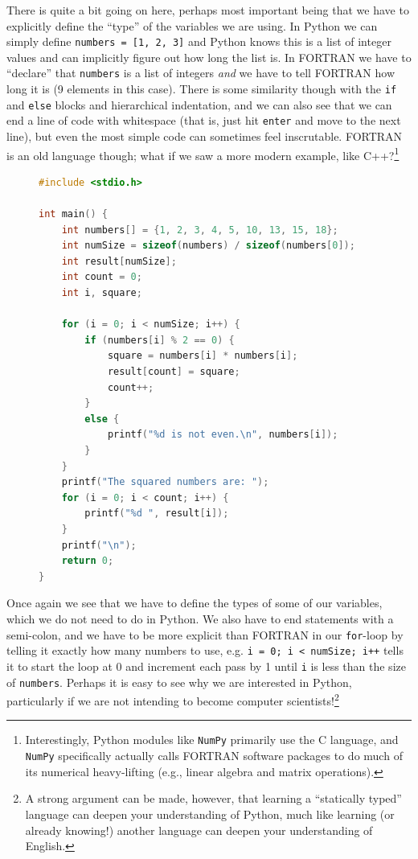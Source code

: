 \documentclass{tufte-book}
\begin{document}
There is quite a bit going on here, perhaps most important being that we have to explicitly define the ``type'' of the variables we are using. In Python we can simply define \verb|numbers = [1, 2, 3]| and Python knows this is a list of integer values and can implicitly figure out how long the list is. In FORTRAN we have to ``declare'' that \verb|numbers| is a list of integers \textit{and} we have to tell FORTRAN how long it is (9 elements in this case). There is some similarity though with the \verb|if| and \verb|else| blocks and hierarchical indentation, and we can also see that we can end a line of code with whitespace (that is, just hit \verb|enter| and move to the next line), but even the most simple code can sometimes feel inscrutable. FORTRAN is an old language though; what if we saw a more modern example, like C++?\footnote{Interestingly, Python modules like \texttt{NumPy} primarily use the C language, and \texttt{NumPy} specifically actually calls FORTRAN software packages to do much of its numerical heavy-lifting (e.g., linear algebra and matrix operations).}
\newpage
\begin{figure}[h]
\begin{lstlisting}[backgroundcolor=\color{lightgray}, language=C++, showstringspaces=false]
#include <stdio.h>

int main() {
    int numbers[] = {1, 2, 3, 4, 5, 10, 13, 15, 18};
	int numSize = sizeof(numbers) / sizeof(numbers[0]);
    int result[numSize];
    int count = 0;
    int i, square;

    for (i = 0; i < numSize; i++) {
        if (numbers[i] % 2 == 0) {
            square = numbers[i] * numbers[i];
            result[count] = square;
            count++;
        }
        else {
            printf("%d is not even.\n", numbers[i]);
        }
    }
    printf("The squared numbers are: ");
    for (i = 0; i < count; i++) {
        printf("%d ", result[i]);
    }
    printf("\n");
    return 0;
}
\end{lstlisting}
\end{figure}

Once again we see that we have to define the types of some of our variables, which we do not need to do in Python. We also have to end statements with a semi-colon, and we have to be more explicit than FORTRAN in our \verb|for|-loop by telling it exactly how many numbers to use, e.g. \verb|i = 0; i < numSize; i++| tells it to start the loop at 0 and increment each pass by 1 until \verb|i| is less than the size of \verb|numbers|. Perhaps it is easy to see why we are interested in Python, particularly if we are not intending to become computer scientists!\footnote{A strong argument can be made, however, that learning a ``statically typed'' language can deepen your understanding of Python, much like learning (or already knowing!) another language can deepen your understanding of English.}
\end{document}
